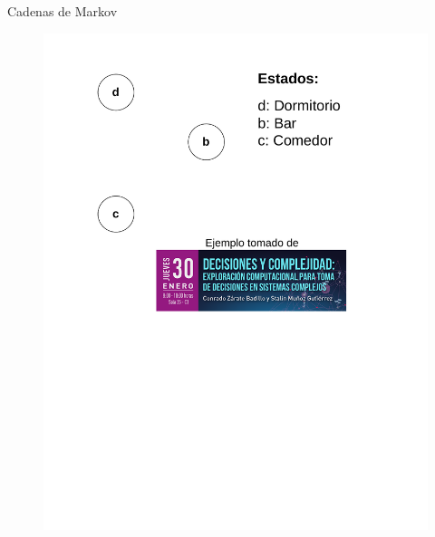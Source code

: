 \documentclass[11pt]{beamer}
\begin{document}
\begin{frame}{Cadenas de Markov}

			\begin{figure}
				\includegraphics[scale=0.5]{images/estados.pdf}
			\end{figure}	

\end{frame}
\end{document}
